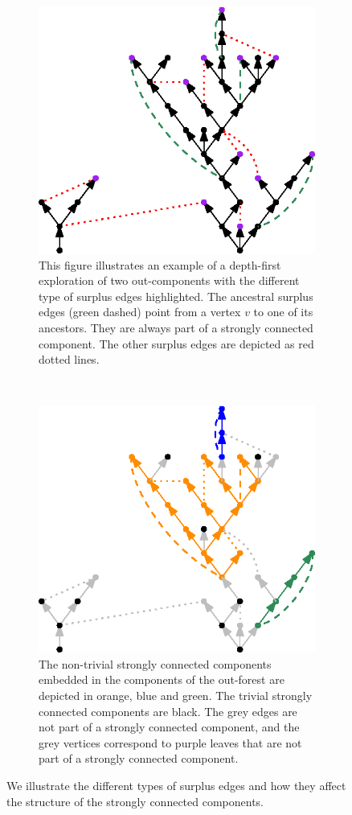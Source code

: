 \begin{figure}
\centering
\begin{subfigure}{0.7\textwidth}
 \centering
    \includegraphics[width=0.7\linewidth]{Content/Pictures/types_of_surplus_edges.eps}
    \caption{This figure illustrates an example of a depth-first exploration of two out-components with the different type of surplus edges highlighted. The ancestral surplus edges (green dashed) point from a vertex $v$ to one of its ancestors. They are always part of a strongly connected component. The other surplus edges are depicted as red dotted lines.}
    \label{subfigure.typesofsurplusedges} 
\end{subfigure}\\
\begin{subfigure}{0.7\textwidth}
  \centering
  \includegraphics[width=0.7\linewidth]{Content/Pictures/sccs_in_example.eps}
  \caption{The non-trivial strongly connected components embedded in the components of the out-forest are depicted in orange, blue and green. The trivial strongly connected components are black. The grey edges are not part of a strongly connected component, and the grey vertices correspond to purple leaves that are not part of a strongly connected component.}
    \label{subfigure.sccinexample}
\end{subfigure}
\caption{We illustrate the different types of surplus edges and how they affect the structure of the strongly connected components.}
\end{figure}

